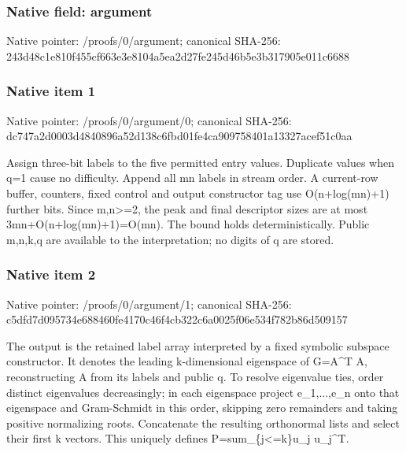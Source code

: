 \documentclass[10pt,a4paper]{article}
\begin{document}
\subsubsection{Native field: argument}
Native pointer: /proofs/0/argument; canonical SHA-256: 243d48c1e810f455cf663e3e8104a5ea2d27fe245d46b5e3b317905e011c6688

\subsubsection{Native item 1}
Native pointer: /proofs/0/argument/0; canonical SHA-256: dc747a2d0003d4840896a52d138c6fbd01fe4ca909758401a13327acef51c0aa

\begingroup\raggedright\sloppy Assign three-bit labels to the five permitted entry values. Duplicate values when q=\allowbreak{}1 cause no difficulty. Append all mn labels in stream order. A current-row buffer,\allowbreak{} counters,\allowbreak{} fixed control and output constructor tag use O(n+log(mn)+1) further bits. Since m,\allowbreak{}n>=\allowbreak{}2,\allowbreak{} the peak and final descriptor sizes are at most 3mn+O(n+log(mn)+1)=\allowbreak{}O(mn). The bound holds deterministically. Public m,\allowbreak{}n,\allowbreak{}k,\allowbreak{}q are available to the interpretation;\allowbreak{} no digits of q are stored.\par\endgroup

\subsubsection{Native item 2}
Native pointer: /proofs/0/argument/1; canonical SHA-256: c5dfd7d095734e688460fe4170c46f4cb322c6a0025f06e534f782b86d509157

\begingroup\raggedright\sloppy The output is the retained label array interpreted by a fixed symbolic subspace constructor. It denotes the leading k-dimensional eigenspace of G=\allowbreak{}A\textasciicircum{}T A,\allowbreak{} reconstructing A from its labels and public q. To resolve eigenvalue ties,\allowbreak{} order distinct eigenvalues decreasingly;\allowbreak{} in each eigenspace project e\_\allowbreak{}1,\allowbreak{}...,\allowbreak{}e\_\allowbreak{}n onto that eigenspace and Gram-Schmidt in this order,\allowbreak{} skipping zero remainders and taking positive normalizing roots. Concatenate the resulting orthonormal lists and select their first k vectors. This uniquely defines P=\allowbreak{}sum\_\allowbreak{}\{j<=\allowbreak{}k\}u\_\allowbreak{}j u\_\allowbreak{}j\textasciicircum{}T.\par\endgroup
\end{document}
